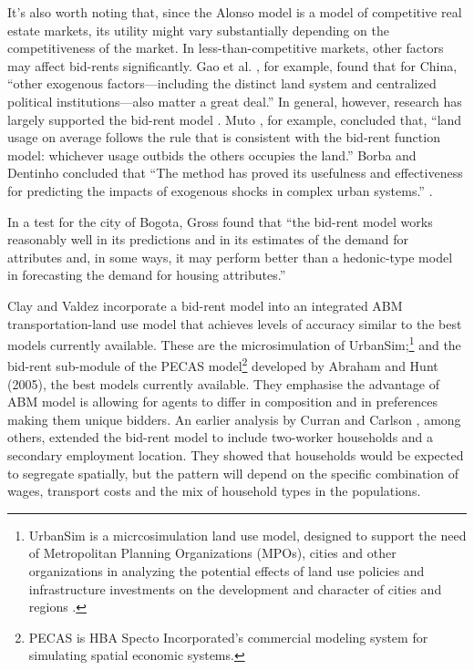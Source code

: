 It's also worth noting that, since the Alonso model is  a model of competitive real estate markets, its utility might vary substantially depending on the competitiveness of the market.  In less-than-competitive markets, other factors may affect bid-rents significantly. %
Gao et al. \cite{GaoJinlong2020BtbT}, for example,  found  that for China, ``other exogenous  factors---including the distinct land system  and centralized political institutions---also matter a great deal.'' In general, however, 
research has largely supported the bid-rent model \cite{mutoEstimationBidRent2006, wheatonBidRentApproach1977}. Muto \cite{mutoEstimationBidRent2006}, for example, concluded that, ``land usage on average follows the rule that is consistent with the bid-rent function model: whichever usage outbids the others occupies the land.''  Borba and Dentinho concluded that ``The method has proved its usefulness and effectiveness for predicting the impacts of exogenous shocks in complex urban systems.'' \cite{borbaEvaluationUrbanScenarios2016}.  

In a test for the city of Bogota, Gross \cite{grossEstimatingWillingnessPay1988} found that ``the bid-rent model works reasonably well in its predictions and in its estimates of the demand for attributes and, in some ways, it may perform better than a hedonic-type model in forecasting the demand for housing attributes.'' 

Clay and Valdez incorporate a bid-rent model into an integrated ABM transportation-land use model that achieves levels of accuracy similar to the best models currently available. These are the microsimulation of UrbanSim;\footnote{UrbanSim is a micrcosimulation land use model, designed to support the need of Metropolitan Planning Organizations (MPOs), cities and other organizations in analyzing the potential effects of land use policies and infrastructure investments on the development and character of cities and regions \cite{waddellmodellinurbandev2002}.} %
and the bid-rent sub-module of the PECAS model\footnote{PECAS is  HBA Specto Incorporated's commercial modeling system  for simulating spatial economic systems.} developed by Abraham and Hunt (2005), the best models currently available. They emphasise the advantage of ABM model is allowing for agents to differ in composition and in preferences making them unique bidders. 
An earlier analysis by Curran and Carlson \cite{curranTheoryResidentialLocation1982}, among others, extended the bid-rent model to include two-worker households and a secondary employment location. They showed that households would be expected to segregate spatially, but the pattern will depend on the specific combination of wages, transport costs and the mix of household types in the populations. 

